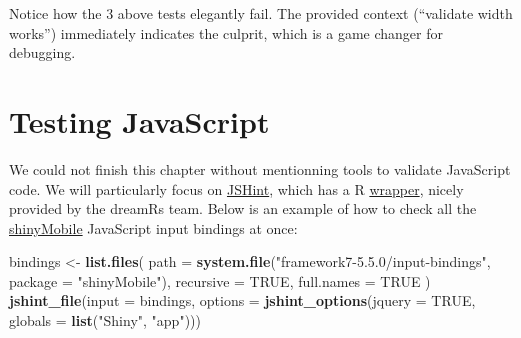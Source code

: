 \documentclass[]{book}
\newenvironment{Shaded}{\begin{snugshade}}{\end{snugshade}}
\newcommand{\DataTypeTok}[1]{\textcolor[rgb]{0.13,0.29,0.53}{#1}}
\newcommand{\KeywordTok}[1]{\textcolor[rgb]{0.13,0.29,0.53}{\textbf{#1}}}
\newcommand{\NormalTok}[1]{#1}
\newcommand{\OtherTok}[1]{\textcolor[rgb]{0.56,0.35,0.01}{#1}}
\newcommand{\StringTok}[1]{\textcolor[rgb]{0.31,0.60,0.02}{#1}}
\begin{document}
Notice how the 3 above tests elegantly fail. The provided context (``validate width works'') immediately indicates the culprit, which is a game changer for debugging.

\hypertarget{testing-javascript}{%
\section{Testing JavaScript}\label{testing-javascript}}

We could not finish this chapter without mentionning tools to validate JavaScript code. We will particularly focus on \href{https://jshint.com}{JSHint}, which has a R \href{https://github.com/dreamRs/jstools}{wrapper}, nicely provided by the dreamRs team. Below is an example of how to check all the \href{https://github.com/RinteRface/shinyMobile}{shinyMobile} JavaScript input bindings at once:

\begin{Shaded}
\begin{Highlighting}[]
\NormalTok{bindings <-}\StringTok{ }\KeywordTok{list.files}\NormalTok{(}
  \DataTypeTok{path =} \KeywordTok{system.file}\NormalTok{(}\StringTok{"framework7-5.5.0/input-bindings"}\NormalTok{, }\DataTypeTok{package =} \StringTok{"shinyMobile"}\NormalTok{),}
  \DataTypeTok{recursive =} \OtherTok{TRUE}\NormalTok{,}
  \DataTypeTok{full.names =} \OtherTok{TRUE}
\NormalTok{)}
\KeywordTok{jshint_file}\NormalTok{(}\DataTypeTok{input =}\NormalTok{ bindings, }\DataTypeTok{options =} \KeywordTok{jshint_options}\NormalTok{(}\DataTypeTok{jquery =} \OtherTok{TRUE}\NormalTok{, }\DataTypeTok{globals =} \KeywordTok{list}\NormalTok{(}\StringTok{"Shiny"}\NormalTok{, }\StringTok{"app"}\NormalTok{)))}
\end{Highlighting}
\end{Shaded}
\end{document}
